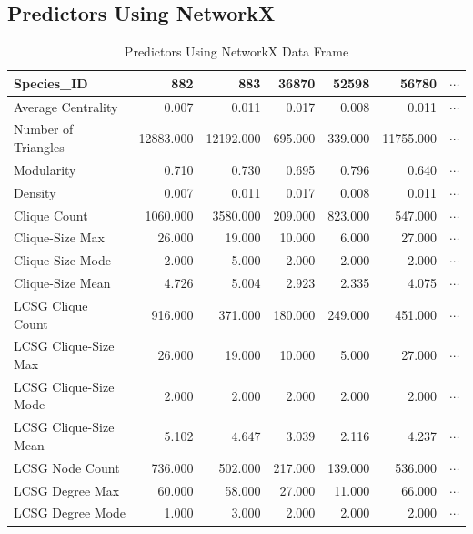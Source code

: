 \documentclass[12pt]{article}
\begin{document}
\subsection{Predictors Using NetworkX}
\begin{table}[H]
\centering
\caption{Predictors Using NetworkX Data Frame}
\begin{tabular}{lrrrrrr}
\toprule
Species\_ID &      882   &      883   &    36870 &    52598 &      56780 & $\cdots$ \\
\midrule
Average Centrality          &      0.007 &      0.011 &    0.017 &    0.008 &      0.011 & $\cdots$\\
Number of Triangles         &  12883.000 &  12192.000 &  695.000 &  339.000 &  11755.000 & $\cdots$\\
Modularity                  &      0.710 &      0.730 &    0.695 &    0.796 &      0.640 & $\cdots$\\
Density                     &      0.007 &      0.011 &    0.017 &    0.008 &      0.011 & $\cdots$\\
Clique Count                &   1060.000 &   3580.000 &  209.000 &  823.000 &    547.000 & $\cdots$\\
Clique-Size Max             &     26.000 &     19.000 &   10.000 &    6.000 &     27.000 & $\cdots$\\
Clique-Size Mode            &      2.000 &      5.000 &    2.000 &    2.000 &      2.000 & $\cdots$\\
Clique-Size Mean            &      4.726 &      5.004 &    2.923 &    2.335 &      4.075 & $\cdots$\\
LCSG Clique Count           &    916.000 &    371.000 &  180.000 &  249.000 &    451.000 & $\cdots$\\
LCSG Clique-Size Max        &     26.000 &     19.000 &   10.000 &    5.000 &     27.000 & $\cdots$\\
LCSG Clique-Size Mode       &      2.000 &      2.000 &    2.000 &    2.000 &      2.000 & $\cdots$\\
LCSG Clique-Size Mean       &      5.102 &      4.647 &    3.039 &    2.116 &      4.237 & $\cdots$\\
LCSG Node Count             &    736.000 &    502.000 &  217.000 &  139.000 &    536.000 & $\cdots$\\
LCSG Degree Max             &     60.000 &     58.000 &   27.000 &   11.000 &     66.000 & $\cdots$\\
LCSG Degree Mode            &      1.000 &      3.000 &    2.000 &    2.000 &      2.000 & $\cdots$\\

\end{tabular}
\end{table}
\end{document}
